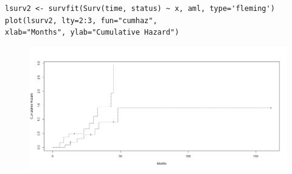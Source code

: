 \documentclass[SurvivalMain.tex]{subfiles}
\begin{document}
\begin{framed}
\begin{verbatim}
lsurv2 <- survfit(Surv(time, status) ~ x, aml, type='fleming') 
plot(lsurv2, lty=2:3, fun="cumhaz", 
xlab="Months", ylab="Cumulative Hazard") 
\end{verbatim}
\end{framed}
\begin{figure}[h!]
\centering
\includegraphics[width=0.7\linewidth]{AML2}
\caption{}
\label{fig:AML2}
\end{figure}
\end{document}
